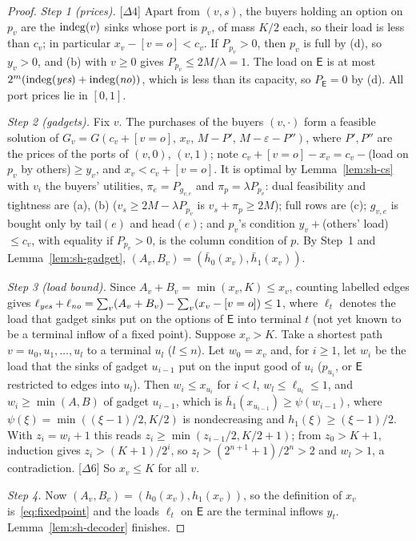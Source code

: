 \begin{proof}
\emph{Step 1 (prices).} [$\Delta4$] Apart from $(v,s)$, the buyers holding an option on $p_v$ are the
$\mathrm{indeg}(v)$ sinks whose port is $p_v$, of mass $K/2$ each, so their load is less than $c_v$; in
particular $x_v-[v=o]<c_v$. If $P_{p_v}>0$, then $p_v$ is full by (d), so $y_v>0$, and (b) with $v\ge0$
gives $P_{p_v}\le2M/\lambda=1$. The load on $\mathsf E$ is at most $2^m(\mathrm{indeg}(\textit{yes})+\mathrm{indeg}(\textit{no}))$, which
is less than its capacity, so $P_{\mathsf E}=0$ by (d). All port prices lie in $[0,1]$.

\emph{Step 2 (gadgets).} Fix $v$. The purchases of the buyers $(v,\cdot)$ form a feasible solution of
$G_v=G(c_v+[v=o],\,x_v,\,M-P',\,M-\varepsilon-P'')$, where $P',P''$ are the prices of the ports of
$(v,0)$, $(v,1)$; note $c_v+[v=o]-x_v=c_v-{}$(load on $p_v$ by others)${}\ge y_v$, and $x_v<c_v+[v=o]$.
It is optimal by Lemma~\ref{lem:sh-cs} with $v_i$ the buyers' utilities, $\pi_e=P_{g_{v,e}}$ and
$\pi_p=\lambda P_{p_v}$: dual feasibility and tightness are (a), (b) ($v_s\ge2M-\lambda P_{p_v}$ is
$v_s+\pi_p\ge2M$); full rows are (c); $g_{v,e}$ is bought only by $\mathrm{tail}(e)$ and
$\mathrm{head}(e)$; and $p_v$'s condition $y_v+{}$(others' load)${}\le c_v$, with equality if
$P_{p_v}>0$, is the column condition of $p$. By Step~1 and Lemma~\ref{lem:sh-gadget},
$(A_v,B_v)=(\bar h_0(x_v),\bar h_1(x_v))$.

\emph{Step 3 (load bound).} Since $A_v+B_v=\min(x_v,K)\le x_v$, counting labelled edges gives
$\ell_{\textit{yes}}+\ell_{\textit{no}}=\sum_v(A_v+B_v)-\sum_v(x_v-[v=o])\le1$, where $\ell_t$ denotes the load that
gadget sinks put on the options of $\mathsf E$ into terminal $t$ (not yet known to be a terminal inflow
of a fixed point). Suppose $x_v>K$. Take a shortest path $v=u_0,u_1,\dots,u_l$ to a terminal $u_l$
($l\le n$). Let $w_0=x_v$ and, for $i\ge1$, let $w_i$ be the load that the sinks of gadget $u_{i-1}$ put
on the input good of $u_i$ ($p_{u_i}$, or $\mathsf E$ restricted to edges into $u_l$). Then $w_i\le
x_{u_i}$ for $i<l$, $w_l\le\ell_{u_l}\le1$, and $w_i\ge\min(A,B)$ of gadget $u_{i-1}$, which is
$\bar h_1(x_{u_{i-1}})\ge\psi(w_{i-1})$, where $\psi(\xi)=\min((\xi-1)/2,K/2)$ is nondecreasing and
$h_1(\xi)\ge(\xi-1)/2$. With $z_i=w_i+1$ this reads $z_i\ge\min(z_{i-1}/2,K/2+1)$; from $z_0>K+1$,
induction gives $z_i>(K+1)/2^i$, so $z_l>(2^{n+1}+1)/2^n>2$ and $w_l>1$, a contradiction. [$\Delta6$] So
$x_v\le K$ for all $v$.

\emph{Step 4.} Now $(A_v,B_v)=(h_0(x_v),h_1(x_v))$, so the definition of $x_v$
is~\eqref{eq:fixedpoint} and the loads $\ell_t$ on $\mathsf E$ are the terminal inflows $y_t$.
Lemma~\ref{lem:sh-decoder} finishes.
\end{proof}

